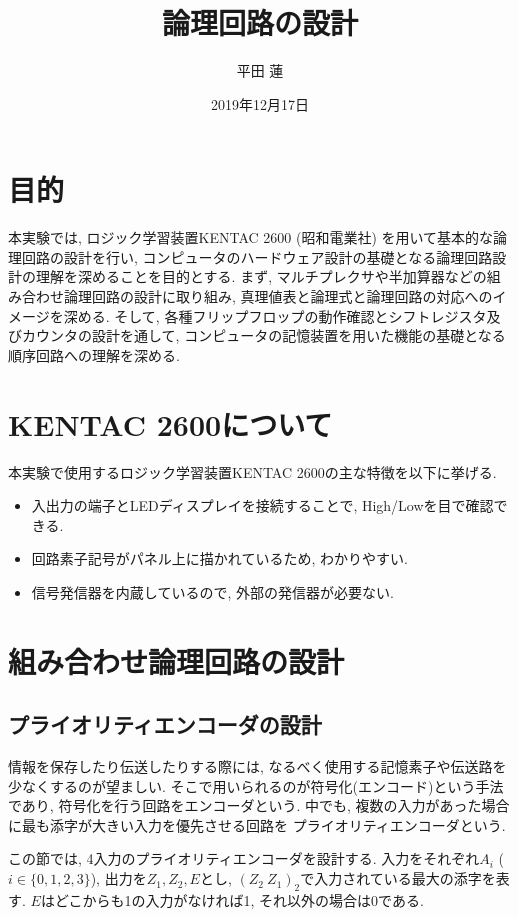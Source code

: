 \documentclass[titlepage]{jsarticle}
\title{論理回路の設計}
\author{平田 蓮}
\date{2019年12月17日}
\begin{document}
\maketitle
\section{目的}
  本実験では, ロジック学習装置KENTAC 2600 (昭和電業社) を用いて基本的な論理回路の設計を行い,
  コンピュータのハードウェア設計の基礎となる論理回路設計の理解を深めることを目的とする.
  まず, マルチプレクサや半加算器などの組み合わせ論理回路の設計に取り組み,
  真理値表と論理式と論理回路の対応へのイメージを深める.
  そして, 各種フリップフロップの動作確認とシフトレジスタ及びカウンタの設計を通して,
  コンピュータの記憶装置を用いた機能の基礎となる順序回路への理解を深める.
\section{KENTAC 2600について}
  本実験で使用するロジック学習装置KENTAC 2600の主な特徴を以下に挙げる.
  \begin{itemize}
    \item 入出力の端子とLEDディスプレイを接続することで, High/Lowを目で確認できる.
    \item 回路素子記号がパネル上に描かれているため, わかりやすい.
    \item 信号発信器を内蔵しているので, 外部の発信器が必要ない.
  \end{itemize}
\section{組み合わせ論理回路の設計}
  \subsection{プライオリティエンコーダの設計}
    情報を保存したり伝送したりする際には, なるべく使用する記憶素子や伝送路を少なくするのが望ましい.
    そこで用いられるのが符号化(エンコード)という手法であり, 符号化を行う回路をエンコーダという.
    中でも, 複数の入力があった場合に最も添字が大きい入力を優先させる回路を
    プライオリティエンコーダという.

    この節では, 4入力のプライオリティエンコーダを設計する.
    入力をそれぞれ$A_i$ ($i \in \{0, 1, 2, 3\}$), 出力を$Z_1, Z_2, E$とし,
    $(Z_2 \ Z_1)_2$で入力されている最大の添字を表す.
    $E$はどこからも1の入力がなければ1, それ以外の場合は0である.
\end{document}
